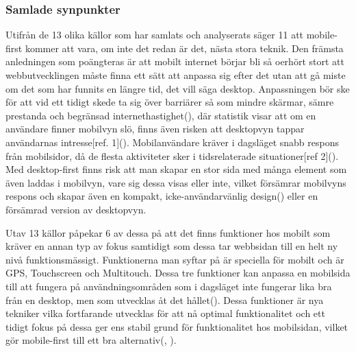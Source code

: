 \documentclass[11pt]{article}
\begin{document}
\subsubsection{Samlade synpunkter}
Utifrån de 13 olika källor som har samlats och analyserats säger 11 att mobile-first kommer att vara, om inte det redan är det, nästa stora teknik. Den främsta anledningen som poängteras är att mobilt internet börjar bli så oerhört stort att webbutvecklingen måste finna ett sätt att anpassa sig efter det utan att gå miste om det som har funnits en längre tid, det vill säga desktop. Anpassningen bör ske för att vid ett tidigt skede ta sig över barriärer så som mindre skärmar, sämre prestanda och begränsad internethastighet(\cite{themepartner}), där statistik visar att om en användare finner mobilvyn slö, finns även risken att desktopvyn tappar användarnas intresse[ref. 1](\cite{zurbword}). Mobilanvändare kräver i dagsläget snabb respons från mobilsidor, då de flesta aktiviteter sker i tidsrelaterade situationer[ref  2](\cite{techradar}). Med desktop-first finns risk att man skapar en stor sida med många element som även laddas i mobilvyn, vare sig dessa visas eller inte, vilket försämrar mobilvyns respons och skapar även en kompakt, icke-användarvänlig design(\cite{zurbword}) eller en försämrad version av desktopvyn.

 Utav 13 källor påpekar 6 av dessa på att det finns funktioner hos mobilt som kräver en annan typ av fokus samtidigt som dessa tar webbsidan till en helt ny nivå funktionsmässigt. Funktionerna man syftar på är speciella för mobilt och är GPS, Touchscreen och Multitouch. Dessa tre funktioner kan anpassa en mobilsida till att fungera på användningsområden som i dagsläget inte fungerar lika bra från en desktop, men som utvecklas åt det hållet(\cite{sweclock}). Dessa funktioner är nya tekniker vilka fortfarande utvecklas för att nå optimal funktionalitet och ett tidigt fokus på dessa ger ens stabil grund för funktionalitet hos mobilsidan, vilket gör mobile-first till ett bra alternativ(\cite{techradar}, \cite{othermedia}).
 
\end{document}
